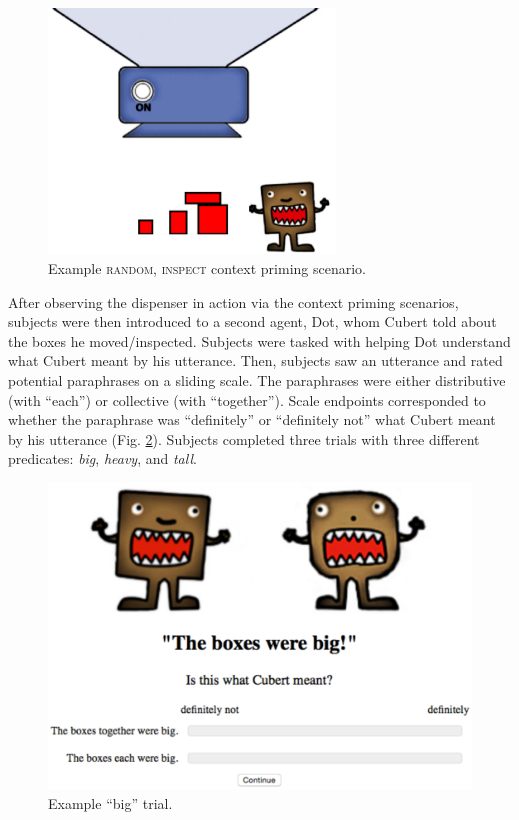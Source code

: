 \documentclass[linguex]{sp}
\begin{document}
\begin{figure}[h]
\centering
\includegraphics[width=3in]{images/context13nodolly.eps}
\caption{Example \textsc{random}, \textsc{inspect} context priming scenario.}\label{random}
\end{figure}


After observing the dispenser in action via the context priming scenarios, subjects were then introduced to a second agent, Dot, whom Cubert told about the boxes he moved/inspected. Subjects were tasked with helping Dot understand what Cubert meant by his utterance. Then, subjects saw an utterance and rated potential paraphrases on a sliding scale. The paraphrases were either distributive (with  ``each'') or collective (with ``together'').  Scale endpoints corresponded to whether the paraphrase was ``definitely'' or ``definitely not'' what Cubert meant by his utterance (Fig. \ref{trial}). Subjects completed three trials with three different predicates: \emph{big}, \emph{heavy}, and \emph{tall}.


\begin{figure}[h]
\centering
\includegraphics[width=4.5in]{images/trial.eps}
\caption{Example ``big'' trial.}\label{trial}
\end{figure}
\end{document}

